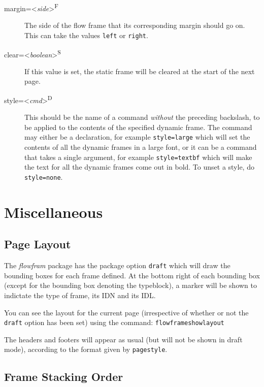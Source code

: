 \documentclass[a4paper]{report}
\newcommand{\cmdname}[1]{\texttt{\symbol{92}#1}}
\newcommand{\meta}[1]{\textnormal{\textless\textit{#1}\textgreater}}
\begin{document}
\begin{description}
\item[margin=\meta{side}\textsuperscript{F}]\mbox{}\par The side of
the flow frame that its corresponding margin should go on. This
can take the values \texttt{left} or \texttt{right}.

\item[clear=\meta{boolean}\textsuperscript{S}] If this value
is set, the static frame will be cleared at the start of the
next page.

\item[style=\meta{cmd}\textsuperscript{D}]\mbox{}\par This should be
the name of a command \emph{without} the preceding backslash,
to be applied to the contents of the specified dynamic frame.
The command may either be a declaration, for example \verb/style=large/
which will set the contents of all the dynamic frames in a
large font, or it can be a command that takes a single argument,
for example \verb/style=textbf/
which will make the text for all the dynamic frames come out in
bold.  To unset a style, do \verb/style=none/.

\end{description}

\chapter{Miscellaneous}

\section*{Page Layout}

The \textsl{flowfram} package has the package option \texttt{draft}
which will draw the {bounding boxes} for
each frame defined.  At the bottom right of each
bounding box (except for the bounding box denoting the
typeblock), a marker will be shown to indictate the type
of frame, its IDN and its IDL.

You can see the layout for the current page (irrespective of
whether or not the \texttt{draft} option has been set) using
the command:\newline
\cmdname{flowframeshowlayout}

The headers and footers will appear as usual (but will not
be shown in draft mode), according to the format given by
\cmdname{pagestyle}.

\section*{Frame Stacking Order}
\end{document}
